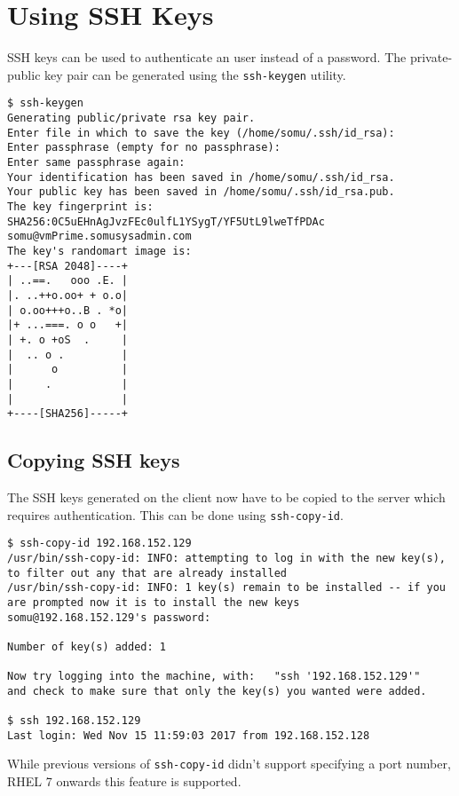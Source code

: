 \section{Using SSH Keys}
SSH keys can be used to authenticate an user instead of a password. The private-public key pair can be generated using the \verb|ssh-keygen| utility.

\begin{verbatim}
$ ssh-keygen
Generating public/private rsa key pair.
Enter file in which to save the key (/home/somu/.ssh/id_rsa): 
Enter passphrase (empty for no passphrase): 
Enter same passphrase again: 
Your identification has been saved in /home/somu/.ssh/id_rsa.
Your public key has been saved in /home/somu/.ssh/id_rsa.pub.
The key fingerprint is:
SHA256:0C5uEHnAgJvzFEc0ulfL1YSygT/YF5UtL9lweTfPDAc somu@vmPrime.somusysadmin.com
The key's randomart image is:
+---[RSA 2048]----+
| ..==.   ooo .E. |
|. ..++o.oo+ + o.o|
| o.oo+++o..B . *o|
|+ ...===. o o   +|
| +. o +oS  .     |
|  .. o .         |
|      o          |
|     .           |
|                 |
+----[SHA256]-----+
\end{verbatim}

\subsection{Copying SSH keys}

The SSH keys generated on the client now have to be copied to the server which requires authentication. This can be done using \verb|ssh-copy-id|.

\begin{verbatim}
$ ssh-copy-id 192.168.152.129
/usr/bin/ssh-copy-id: INFO: attempting to log in with the new key(s), to filter out any that are already installed
/usr/bin/ssh-copy-id: INFO: 1 key(s) remain to be installed -- if you are prompted now it is to install the new keys
somu@192.168.152.129's password: 

Number of key(s) added: 1

Now try logging into the machine, with:   "ssh '192.168.152.129'"
and check to make sure that only the key(s) you wanted were added.

$ ssh 192.168.152.129
Last login: Wed Nov 15 11:59:03 2017 from 192.168.152.128
\end{verbatim}

While previous versions of \verb|ssh-copy-id| didn't support specifying a port number, RHEL 7 onwards this feature is supported. 

